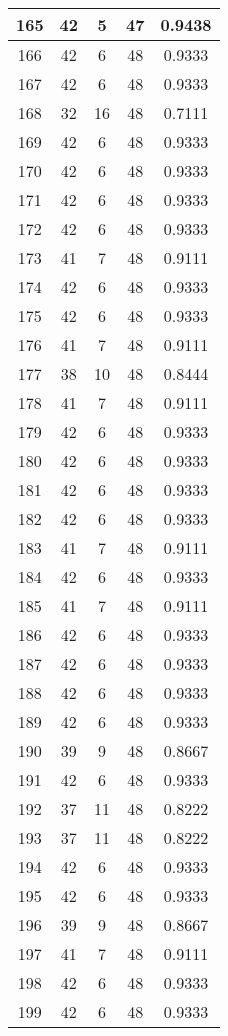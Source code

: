 \documentclass[letterpaper, 12pt]{article}
\begin{document}
\begin{longtable}{|c|c|c|c|c|}
\hline
165 & 42 & 5 & 47 & 0.9438 \\
\hline
166 & 42 & 6 & 48 & 0.9333 \\
\hline
167 & 42 & 6 & 48 & 0.9333 \\
\hline
168 & 32 & 16 & 48 & 0.7111 \\
\hline
169 & 42 & 6 & 48 & 0.9333 \\
\hline
170 & 42 & 6 & 48 & 0.9333 \\
\hline
171 & 42 & 6 & 48 & 0.9333 \\
\hline
172 & 42 & 6 & 48 & 0.9333 \\
\hline
173 & 41 & 7 & 48 & 0.9111 \\
\hline
174 & 42 & 6 & 48 & 0.9333 \\
\hline
175 & 42 & 6 & 48 & 0.9333 \\
\hline
176 & 41 & 7 & 48 & 0.9111 \\
\hline
177 & 38 & 10 & 48 & 0.8444 \\
\hline
178 & 41 & 7 & 48 & 0.9111 \\
\hline
179 & 42 & 6 & 48 & 0.9333 \\
\hline
180 & 42 & 6 & 48 & 0.9333 \\
\hline
181 & 42 & 6 & 48 & 0.9333 \\
\hline
182 & 42 & 6 & 48 & 0.9333 \\
\hline
183 & 41 & 7 & 48 & 0.9111 \\
\hline
184 & 42 & 6 & 48 & 0.9333 \\
\hline
185 & 41 & 7 & 48 & 0.9111 \\
\hline
186 & 42 & 6 & 48 & 0.9333 \\
\hline
187 & 42 & 6 & 48 & 0.9333 \\
\hline
188 & 42 & 6 & 48 & 0.9333 \\
\hline
189 & 42 & 6 & 48 & 0.9333 \\
\hline
190 & 39 & 9 & 48 & 0.8667 \\
\hline
191 & 42 & 6 & 48 & 0.9333 \\
\hline
192 & 37 & 11 & 48 & 0.8222 \\
\hline
193 & 37 & 11 & 48 & 0.8222 \\
\hline
194 & 42 & 6 & 48 & 0.9333 \\
\hline
195 & 42 & 6 & 48 & 0.9333 \\
\hline
196 & 39 & 9 & 48 & 0.8667 \\
\hline
197 & 41 & 7 & 48 & 0.9111 \\
\hline
198 & 42 & 6 & 48 & 0.9333 \\
\hline
199 & 42 & 6 & 48 & 0.9333 \\
\hline
\end{longtable}
\end{document}
